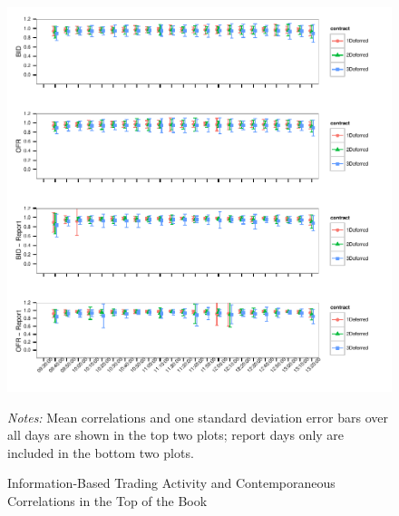 \documentclass[review,12pt]{elsarticle}
\begin{document}
\begin{figure}[htbp]
\includegraphics[scale=0.95]{TablesFigures_files/figure-latex/unnamed-chunk-4-1.pdf}
{\footnotesize  \emph{Notes:} Mean correlations and one standard deviation error bars over all days
are shown in the top two plots; report days only are included in the
bottom two plots. \par}
\caption{Information-Based Trading Activity and Contemporaneous
Correlations in the Top of the Book}
\end{figure}


\clearpage
\end{document}
